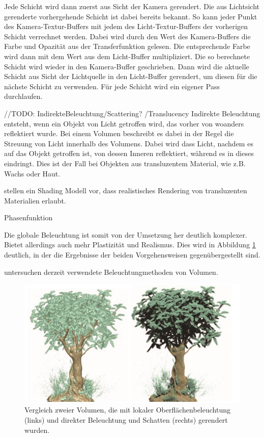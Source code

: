 Jede Schicht wird dann zuerst aus Sicht der Kamera gerendert. Die aus Lichtsicht gerenderte vorhergehende Schicht ist dabei bereits bekannt. So kann jeder Punkt des Kamera-Textur-Buffers mit jedem des Licht-Textur-Buffers der vorherigen Schicht verrechnet werden. Dabei wird durch den Wert des Kamera-Buffers die Farbe und Opazität aus der Transferfunktion gelesen. Die entsprechende Farbe wird dann mit dem Wert aus dem Licht-Buffer multipliziert. Die so berechnete Schicht wird wieder in den Kamera-Buffer geschrieben. Dann wird die aktuelle Schicht aus Sicht der Lichtquelle in den Licht-Buffer gerendert, um diesen für die nächste Schicht zu verwenden.
Für jede Schicht wird ein eigener Pass durchlaufen.
\citet{Hadwiger06}
\citet{Fernando04}

//TODO:
IndirekteBeleuchtung/Scattering? /Translucency  
Indirekte Beleuchtung entsteht, wenn ein Objekt von Licht getroffen wird, das vorher von woanders reflektiert wurde. Bei einem Volumen beschreibt es dabei in der Regel die Streuung von Licht innerhalb des Volumens. Dabei wird dass Licht, nachdem es auf das Objekt getroffen ist, von dessen Inneren reflektiert, während es in dieses eindringt. Dies ist der Fall bei Objekten aus transluzentem Material, wie z.B. Wachs oder Haut.

\citet{hansen03} stellen ein Shading Modell vor, dass realistisches Rendering von transluzenten Materialien erlaubt.

Phasenfunktion 

Die globale Beleuchtung ist somit von der Umsetzung her deutlich komplexer. Bietet allerdings auch mehr Plastizität und Realismus. Dies wird in Abbildung \ref{img:localGlobalIll} deutlich, in der die Ergebnisse der beiden Vorgehensweisen gegenübergestellt sind.

\citet{Jnsson14} untersuchen derzeit verwendete Beleuchtungmethoden von Volumen.

\begin{figure}
	\centering
	\includegraphics[width=0.7\linewidth]{images/localGlobalIllumination.png}
	\caption{Vergleich zweier Volumen, die mit lokaler Oberflächenbeleuchtung (links) und direkter Beleuchtung und Schatten (rechts) gerendert wurden. \citet{Hadwiger06}}
	\label{img:localGlobalIll}
\end{figure}

